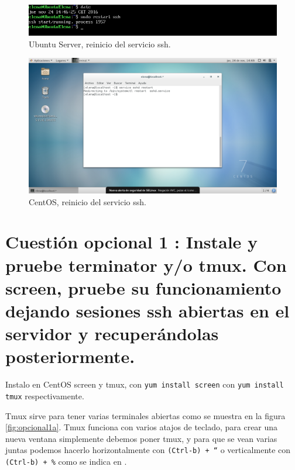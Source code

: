 \begin{figure}[H] 
	\centering
	\includegraphics[width=15cm]{./img/ejercicio8-1.png} 	
	\caption{Ubuntu Server, reinicio del servicio ssh.} \label{fig:ejercicio8-1}
\end{figure}

\begin{figure}[H] 
	\centering
	\includegraphics[width=15cm]{./img/ejercicio8-2.png} 	
	\caption{CentOS, reinicio del servicio ssh.} \label{fig:ejercicio8-2}
\end{figure}


\section{Cuestión opcional 1 : Instale y pruebe terminator y/o tmux. Con screen, pruebe su funcionamiento dejando sesiones ssh abiertas en el servidor y recuperándolas posteriormente.}
Instalo en CentOS screen y tmux, con \texttt{yum install screen} con \texttt{yum install tmux} respectivamente.

Tmux sirve para tener varias terminales abiertas como se muestra en la figura \ref{fig:opcional1a}. Tmux funciona con varios atajos de teclado, para crear una nueva ventana simplemente debemos poner tmux, y para que se vean varias juntas podemos hacerlo horizontalmente con \texttt{(Ctrl-b) + “} o verticalmente con  \texttt{(Ctrl-b) + \%} como se indica en \cite{tmux}.


